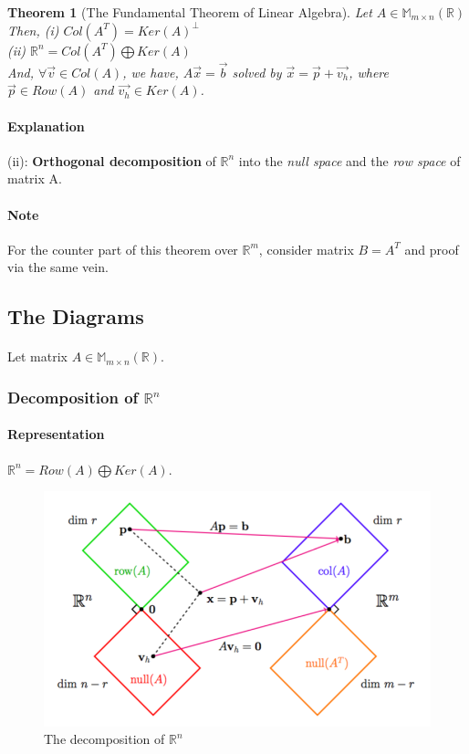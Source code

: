 \documentclass[11pt]{article}
\newtheorem{theorem}{Theorem}
\newcommand{\re}[1]{\mathbb{R}^#1}
\newcommand{\ma}[2]{\mathbb{M}_{#1 \times #2}}
\begin{document}
	\begin{theorem}[The Fundamental Theorem of Linear Algebra]
		Let $A \in \ma{m}{n}(\mathbb{R})$ \\
		Then, (i) $Col(A^T) = Ker(A)^\perp$ \\
		
		(ii) $\re{n} = Col(A^T) \bigoplus Ker(A)$ \\
		
		And, $\forall \vec{v} \in Col(A)$, we have, $A\vec{x} = \vec{b}$ solved by $\vec{x} = \vec{p} + \vec{v_h}$, where $\vec{p} \in Row(A)$ and $\vec{v_h} \in Ker(A)$.\\
		 
	\end{theorem}
	\paragraph{Explanation} (ii): \textbf{Orthogonal decomposition} of $\re{n}$ into the \emph{null space} and the \emph{row space} of matrix A.
	\paragraph{Note} For the counter part of this theorem over $\re{m}$, consider matrix $B = A^T$ and proof via the same vein.
	
	\subsection{The Diagrams}
	\paragraph{} Let matrix $A \in \ma{m}{n}(\mathbb{R})$.
	\subsubsection{Decomposition of $\re{n}$}
	\paragraph{Representation} $\re{n} = Row(A) \bigoplus Ker(A)$.
	\begin{figure}[h]
		\centering
		\includegraphics[width=\linewidth]{223_pic/decomposition_rn}
		\caption{The decomposition of $\re{n}$}
	\end{figure}
	
\end{document}
